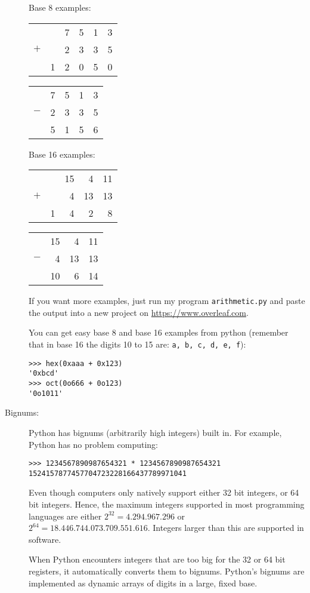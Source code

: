 \documentclass{article}
\begin{document}
\begin{description}
Base 8 examples:\hfill
\begin{tabular}{rrrrrr}
  &  &7 &5 &1 &3\\
$+$ &  &2 &3 &3 &5\\
\hline
  &1 &2 &0 &5 &0\\
\end{tabular}\hfill
\begin{tabular}{rrrrr}
  &7 &5 &1 &3\\
$-$ &2 &3 &3 &5\\
\hline
  &5 &1 &5 &6\\
\end{tabular}

Base 16 examples:\hfill
\begin{tabular}{rrrrr}
  &  &15 &4 &11\\
$+$ &  &4 &13 &13\\
\hline
  &1 &4 &2 &8\\
\end{tabular}\hfill
\begin{tabular}{rrrr}
  &15 &4 &11\\
$-$ &4 &13 &13\\
\hline
  &10 &6 &14\\
\end{tabular}

If you want more examples, just run my program {\tt arithmetic.py}
and paste the output into a new project on \url{https://www.overleaf.com}.

You can get easy base 8 and base 16 examples from python (remember that
in base 16 the digits 10 to 15 are: {\tt a, b, c, d, e, f}):
\begin{lstlisting}
>>> hex(0xaaa + 0x123)
'0xbcd'
>>> oct(0o666 + 0o123)
'0o1011'
\end{lstlisting}

\item[Bignums:]  Python has bignums (arbitrarily high integers) built in.  For example, Python
has no problem computing:
\begin{lstlisting}
>>> 1234567890987654321 * 1234567890987654321
1524157877457704723228166437789971041
\end{lstlisting}
Even though computers only natively support either 32 bit integers, or 64
bit integers.  Hence, the maximum integers supported in most programming
languages are either $2^{32} = 4.294.967.296$ or  $2^{64} = 18.446.744.073.709.551.616$.
Integers larger than this are supported in software.

When Python encounters integers that are too big for the 32 or 64 bit
registers, it automatically converts them to bignums.   Python's bignums
are implemented as dynamic arrays of digits in a large, fixed base.


\end{description}
\end{document}
